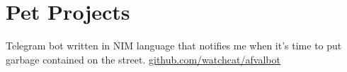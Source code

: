 \documentclass[]{hieudo-build}
\begin{document}
\begin{minipage}[t]{0.65\textwidth}
\section{Pet Projects}
\descript{}
Telegram bot written in NIM language that notifies me when it's time to put garbage contained on the street. \href{https://github.com/watchcat/afvalbot} {github.com/watchcat/afvalbot}
\sectionsep




\end{minipage} 
\end{document}
